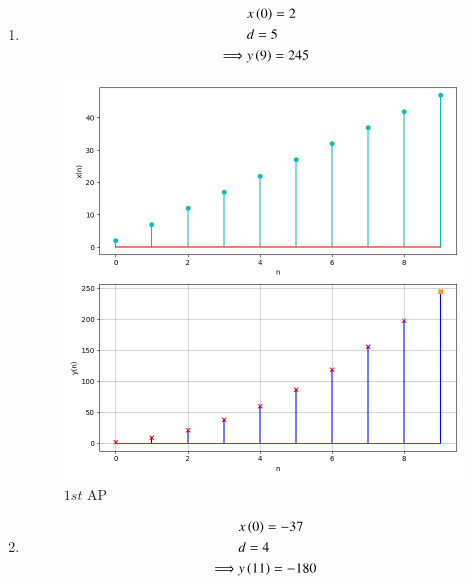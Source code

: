 \documentclass[journal,12pt,twocolumn]{IEEEtran}
\theoremstyle{remark}
\begin{document}
\begin{enumerate}[label=(\alph*)]
    \item \begin{align}
        &x\left(0\right)=2 \\
        &d=5 \\
        \implies &y\left(9\right)=245
    \end{align}
    \begin{figure}[h!]
        \centering
        \includegraphics[width=\columnwidth]{figs/plt1.png}
        \caption{$1st$ AP}
    \end{figure}
    \item \begin{align}
        &x\left(0\right)=-37 \\
        &d=4 \\
        \implies &y\left(11\right)=-180
    \end{align}
    \begin{figure}[h!]
        \centering

\end{figure}
\end{enumerate}
\end{document}
